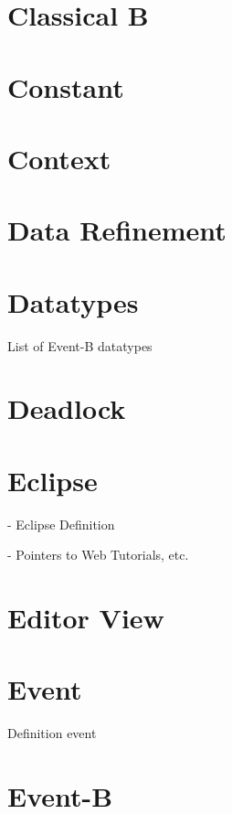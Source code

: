 \section{Classical B}
\label{classical_b}

\section{Constant}
\label{constant}

\section{Context}
\label{context}

\section{Data Refinement}
\label{data_refinement}

\section{Datatypes}
\label{datatypes}

List of Event-B datatypes

\section{Deadlock}
\label{deadlock}

\section{Eclipse}
\label{eclipse}

- Eclipse Definition

- Pointers to Web Tutorials, etc.

\section{Editor View}
\label{editor_view}


\section{Event}
\label{event}

Definition event

\section{Event-B}
\label{eventb}

